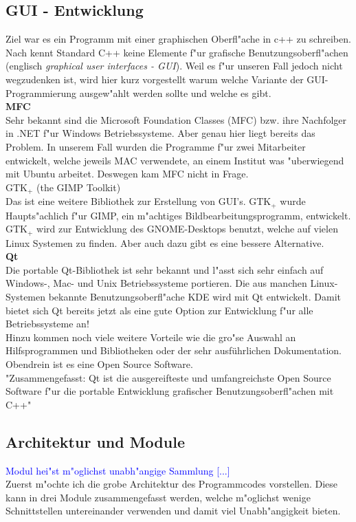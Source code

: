 \documentclass[11pt, a4paper, german]{article}
\theoremstyle{plain}
\begin{document}
	\subsection{GUI - Entwicklung}
	Ziel war es ein Programm mit einer graphischen Oberfl"ache in c++ zu schreiben. Nach \cite[14 - Grafische Benutzungsschnittstellen]{breymann2011c++} kennt Standard C++ keine Elemente f"ur grafische Benutzungsoberfl"achen (englisch \textit{graphical user interfaces - GUI}). Weil es f"ur unseren Fall jedoch nicht wegzudenken ist, wird hier kurz vorgestellt warum welche Variante der GUI-Programmierung ausgew"ahlt werden sollte und welche es gibt.\\
	
	\textbf{MFC}\\
	Sehr bekannt sind die Microsoft Foundation Classes (MFC) bzw. ihre Nachfolger in .NET f"ur Windows Betriebssysteme. Aber genau hier liegt bereits das Problem. In unserem Fall wurden die Programme f"ur zwei Mitarbeiter entwickelt, welche jeweils MAC verwendete, an einem Institut was "uberwiegend mit Ubuntu arbeitet. Deswegen kam MFC nicht in Frage.\\
	
	\textbf{$ \text{GTK}_+ $ }(the GIMP Toolkit)\\
	Das ist eine weitere Bibliothek zur Erstellung von GUI's. $ \text{GTK}_+ $ wurde Haupts"achlich f"ur GIMP, ein m"achtiges Bildbearbeitungsprogramm, entwickelt. $ \text{GTK}_+ $ wird zur Entwicklung des GNOME-Desktops benutzt, welche auf vielen Linux Systemen zu finden. Aber auch dazu gibt es eine bessere Alternative.\\
	
	\textbf{Qt}\\
	Die portable Qt-Bibliothek ist sehr bekannt und l"asst sich sehr einfach auf Windows-, Mac- und Unix Betriebssysteme portieren. Die aus manchen Linux-Systemen bekannte Benutzungsoberfl"ache KDE wird mit Qt entwickelt. Damit bietet sich Qt bereits jetzt als eine gute Option zur Entwicklung f"ur alle Betriebssysteme an!\\
	Hinzu kommen noch viele weitere Vorteile wie die gro"se Auswahl an Hilfsprogrammen und Bibliotheken oder der sehr ausführlichen Dokumentation. Obendrein ist es eine Open Source Software.\\
	"{}Zusammengefasst: Qt ist die ausgereifteste und umfangreichste Open Source Software f"ur die portable Entwicklung grafischer Benutzungsoberfl"achen mit C++"{}\cite[S.452]{breymann2011c++}

	\subsection{Architektur und Module}
	\textcolor{blue}{Modul hei"st m"oglichst unabh"angige Sammlung [...]}\\
	Zuerst m"ochte ich die grobe Architektur des Programmcodes vorstellen. Diese kann in drei Module zusammengefasst werden, welche m"oglichst wenige Schnittstellen untereinander verwenden und damit viel Unabh"angigkeit bieten.
	
\end{document}
